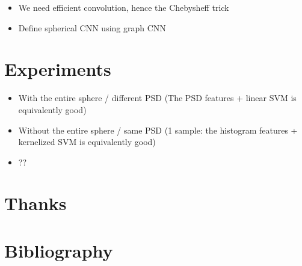 \documentclass[preprint,12pt,authoryear]{elsarticle}
\newcommand{\assign}[1]{{\color[rgb]{.8,.5,.8}{Assigned: #1 }}}
\begin{document}
\begin{itemize}
	\item We need efficient convolution, hence the Chebysheff trick
	\item Define spherical CNN using graph CNN
\end{itemize}

\section{Experiments}
\assign{Nathanael, Tomek}

\begin{itemize}
	\item With the entire sphere / different PSD (The PSD features + linear SVM is equivalently good)
	\item Without the entire sphere / same PSD (1 sample: the histogram features + kernelized SVM is equivalently good)
	\item ??
\end{itemize}


\section*{Thanks}



\section*{Bibliography}
 

\end{document}
